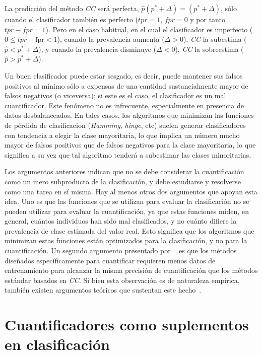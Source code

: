 La predicción del método {\it CC\/} será perfecta, $\hat p(p^* + \Delta) = (p^*
+ \Delta)$, sólo cuando el clasificador también es perfecto (${tpr} = 1$, ${fpr}
= 0$ y por tanto ${tpr} - {fpr} = 1$). Pero en el caso habitual, en el cual el
clasificador es imperfecto ($0 \leq {tpr} - \text {fpr} < 1$), cuando la
prevalencia aumenta ($\Delta > 0$), {\it CC\/} la subestima ($\hat p < p^* +
\Delta $), y cuando la prevalencia disminuye ($\Delta < 0$), {\it CC\/} la
sobreestima ($\hat p > p^* + \Delta $).

Un buen clasificador puede estar sesgado, es decir, puede mantener sus falsos
positivos al mínimo sólo a expensas de una cantidad sustancialmente mayor de
falsos negativos (o viceversa); si este es el caso, el clasificador es un mal
cuantificador. Este fenómeno no es infrecuente, especialmente en presencia de
datos desbalanceados. En tales casos, los algoritmos que minimizan las funciones
de pérdida de clasificacion ({\it Hamming}, {\it hinge}, etc) suelen generar
clasificadores con tendencia a elegir la clase mayoritaria, lo que implica un
número mucho mayor de falsos positivos que de falsos negativos para la clase
mayoritaria, lo que significa a su vez que tal algoritmo tenderá a subestimar
las clases minoritarias.

Los argumentos anteriores indican que no se debe considerar la cuantificación
como un mero subproducto de la clasificación, y debe estudiarse y resolverse
como una tarea en sí misma. Hay al menos otros dos argumentos que apoyan esta
idea. Uno es que las funciones que se utilizan para evaluar la clasificación no
se pueden utilizar para evaluar la cuantificación, ya que estas funciones miden,
en general, cuántos individuos han sido mal clasificados, y no cuánto difiere la
prevalencia de clase estimada del valor real. Esto significa que los algoritmos
que minimizan estas funciones están optimizados para la clasificación, y no para
la cuantificación. Un segundo argumento presentado por
~\citet{forman2008quantifying} es que los métodos diseñados específicamente para
cuantificar requieren menos datos de entrenamiento para alcanzar la misma
precisión de cuantificación que los métodos estándar basados en {\it CC}. Si
bien esta observación es de naturaleza empírica, también existen argumentos
teóricos que sustentan este hecho~\cite{vapnik1999overview}.

\section{Cuantificadores como suplementos en clasificación}

